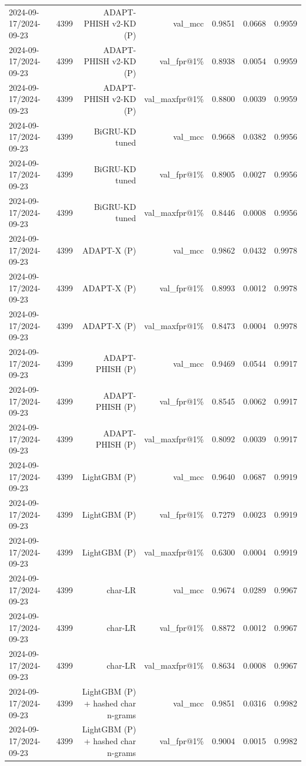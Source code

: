 \begin{table}[t]
\begin{tabular}{llrrrrr}
2024-09-17/2024-09-23 & 4399 & ADAPT-PHISH v2-KD (P) & val\_mcc & 0.9851 & 0.0668 & 0.9959 \\
2024-09-17/2024-09-23 & 4399 & ADAPT-PHISH v2-KD (P) & val\_fpr@1\% & 0.8938 & 0.0054 & 0.9959 \\
2024-09-17/2024-09-23 & 4399 & ADAPT-PHISH v2-KD (P) & val\_maxfpr@1\% & 0.8800 & 0.0039 & 0.9959 \\
2024-09-17/2024-09-23 & 4399 & BiGRU-KD tuned & val\_mcc & 0.9668 & 0.0382 & 0.9956 \\
2024-09-17/2024-09-23 & 4399 & BiGRU-KD tuned & val\_fpr@1\% & 0.8905 & 0.0027 & 0.9956 \\
2024-09-17/2024-09-23 & 4399 & BiGRU-KD tuned & val\_maxfpr@1\% & 0.8446 & 0.0008 & 0.9956 \\
2024-09-17/2024-09-23 & 4399 & ADAPT-X (P) & val\_mcc & 0.9862 & 0.0432 & 0.9978 \\
2024-09-17/2024-09-23 & 4399 & ADAPT-X (P) & val\_fpr@1\% & 0.8993 & 0.0012 & 0.9978 \\
2024-09-17/2024-09-23 & 4399 & ADAPT-X (P) & val\_maxfpr@1\% & 0.8473 & 0.0004 & 0.9978 \\
2024-09-17/2024-09-23 & 4399 & ADAPT-PHISH (P) & val\_mcc & 0.9469 & 0.0544 & 0.9917 \\
2024-09-17/2024-09-23 & 4399 & ADAPT-PHISH (P) & val\_fpr@1\% & 0.8545 & 0.0062 & 0.9917 \\
2024-09-17/2024-09-23 & 4399 & ADAPT-PHISH (P) & val\_maxfpr@1\% & 0.8092 & 0.0039 & 0.9917 \\
2024-09-17/2024-09-23 & 4399 & LightGBM (P) & val\_mcc & 0.9640 & 0.0687 & 0.9919 \\
2024-09-17/2024-09-23 & 4399 & LightGBM (P) & val\_fpr@1\% & 0.7279 & 0.0023 & 0.9919 \\
2024-09-17/2024-09-23 & 4399 & LightGBM (P) & val\_maxfpr@1\% & 0.6300 & 0.0004 & 0.9919 \\
2024-09-17/2024-09-23 & 4399 & char-LR & val\_mcc & 0.9674 & 0.0289 & 0.9967 \\
2024-09-17/2024-09-23 & 4399 & char-LR & val\_fpr@1\% & 0.8872 & 0.0012 & 0.9967 \\
2024-09-17/2024-09-23 & 4399 & char-LR & val\_maxfpr@1\% & 0.8634 & 0.0008 & 0.9967 \\
2024-09-17/2024-09-23 & 4399 & LightGBM (P) + hashed char n-grams & val\_mcc & 0.9851 & 0.0316 & 0.9982 \\
2024-09-17/2024-09-23 & 4399 & LightGBM (P) + hashed char n-grams & val\_fpr@1\% & 0.9004 & 0.0015 & 0.9982 \\

\end{tabular}
\end{table}
